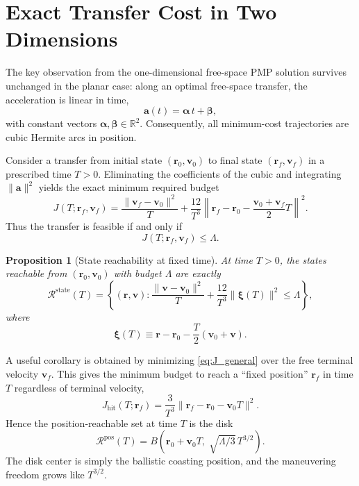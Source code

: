 \documentclass[journal, a4paper]{IEEEtran}
\newtheorem{proposition}{Proposition}
\begin{document}
\section{Exact Transfer Cost in Two Dimensions}
The key observation from the one-dimensional free-space PMP solution survives unchanged in the planar case: along an optimal free-space transfer, the acceleration is linear in time,
\begin{equation}
\mathbf a(t)=\boldsymbol\alpha\,t+\boldsymbol\beta,
\end{equation}
with constant vectors $\boldsymbol\alpha,\boldsymbol\beta\in\mathbb R^2$. Consequently, all minimum-cost trajectories are cubic Hermite arcs in position.

Consider a transfer from initial state $(\mathbf r_0,\mathbf v_0)$ to final state $(\mathbf r_f,\mathbf v_f)$ in a prescribed time $T>0$. Eliminating the coefficients of the cubic and integrating $\|\mathbf a\|^2$ yields the exact minimum required budget
\begin{equation}
J(T;\mathbf r_f,\mathbf v_f)
=
\frac{\|\mathbf v_f-\mathbf v_0\|^2}{T}
+\frac{12}{T^3}
\left\|
\mathbf r_f-\mathbf r_0-\frac{\mathbf v_0+\mathbf v_f}{2}T
\right\|^2.
\label{eq:J_general}
\end{equation}
Thus the transfer is feasible if and only if
\begin{equation}
J(T;\mathbf r_f,\mathbf v_f)\le \Lambda.
\label{eq:transfer_feasible}
\end{equation}

\begin{proposition}[State reachability at fixed time]
At time $T>0$, the states reachable from $(\mathbf r_0,\mathbf v_0)$
with budget $\Lambda$ are exactly
\begin{equation}
\mathcal R^{\mathrm{state}}(T)=
\left\{
(\mathbf r,\mathbf v):
\frac{\|\mathbf v-\mathbf v_0\|^2}{T}
+\frac{12}{T^3}\|\boldsymbol\xi(T)\|^2
\le \Lambda
\right\},
\label{eq:state_reach_set}
\end{equation}
where
\begin{equation}
\boldsymbol\xi(T)\equiv
\mathbf r-\mathbf r_0-\frac{T}{2}(\mathbf v_0+\mathbf v).
\label{eq:xi_def}
\end{equation}
\end{proposition}

A useful corollary is obtained by minimizing \eqref{eq:J_general} over the free terminal velocity $\mathbf v_f$. This gives the minimum budget to reach a ``fixed position'' $\mathbf r_f$ in time $T$ regardless of terminal velocity,
\begin{equation}
J_{\mathrm{hit}}(T;\mathbf r_f)
=\frac{3}{T^3}\|\mathbf r_f-\mathbf r_0-\mathbf v_0 T\|^2.
\label{eq:J_hit}
\end{equation}
Hence the position-reachable set at time $T$ is the disk
\begin{equation}
\mathcal R^{\mathrm{pos}}(T)=
B\!\left(\mathbf r_0+\mathbf v_0T,\;\sqrt{\Lambda/3}\,T^{3/2}\right).
\label{eq:pos_reach_set}
\end{equation}
The disk center is simply the ballistic coasting position, and the maneuvering freedom grows like $T^{3/2}$.
\end{document}
